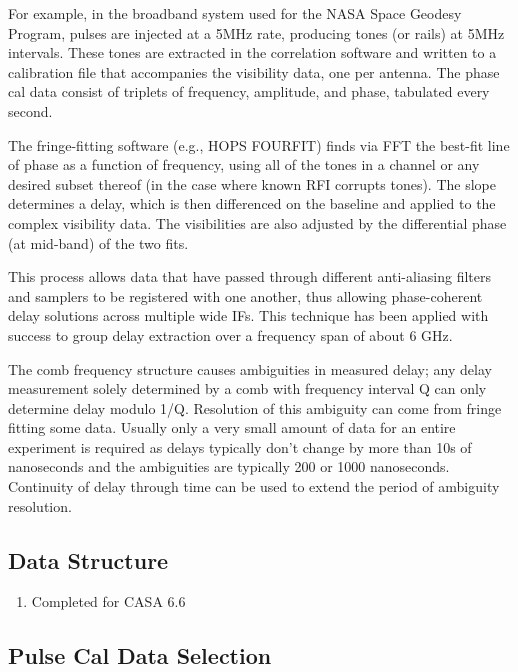 \documentclass[11pt,a4paper]{article}
\begin{document}
For example, in the broadband system used for the NASA Space Geodesy
Program, pulses are injected at a 5MHz rate, producing tones (or
rails) at 5MHz intervals.  These tones are extracted in the
correlation software and written to a calibration file that
accompanies the visibility data, one per antenna. The phase cal data
consist of triplets of frequency, amplitude, and phase, tabulated
every second.

The fringe-fitting software (e.g., HOPS FOURFIT) finds via FFT the
best-fit line of phase as a function of frequency, using all of the
tones in a channel or any desired subset thereof (in the case where
known RFI corrupts tones). The slope determines a delay, which is then
differenced on the baseline and applied to the complex visibility
data.  The visibilities are also adjusted by the differential phase
(at mid-band) of the two fits.

This process allows data that have passed through different
anti-aliasing filters and samplers to be registered with one another,
thus allowing phase-coherent delay solutions across multiple wide IFs.
This technique has been applied with success to group delay extraction
over a frequency span of about 6 GHz.

The comb frequency structure causes ambiguities in measured delay; any
delay measurement solely determined by a comb with frequency interval
Q can only determine delay modulo 1/Q. Resolution of this ambiguity
can come from fringe fitting some data. Usually only a very small
amount of data for an entire experiment is required as delays
typically don’t change by more than 10s of nanoseconds and the
ambiguities are typically 200 or 1000 nanoseconds. Continuity of delay
through time can be used to extend the period of ambiguity resolution.

\subsection{Data Structure}

\begin{enumerate}[subseclist]

\item Completed for CASA 6.6

\end{enumerate}

\subsection{Pulse Cal Data Selection}
\end{document}
